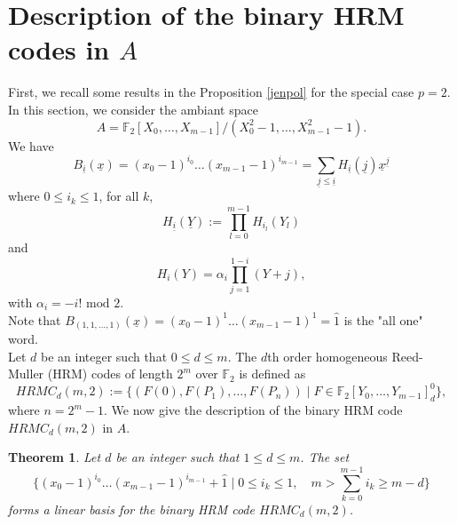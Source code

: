 \documentclass{article}
\theoremstyle{plain}
\newtheorem{thm}{Theorem}[section]
\theoremstyle{definition}
\begin{document}
\section{Description of the binary HRM codes in $A$}
First, we recall some results in the Proposition \ref{jenpol} for the special case $p=2$. In this section, we consider the ambiant space
\begin{equation*}
A=\mathbb{F}_{2}[X_{0},\ldots ,X_{m-1}]/(X_{0}^{2}-1,\ldots ,X_{m-1}^{2}-1).
\end{equation*}
We have
\begin{equation*}
B_{\underline{i}}(\underline{x})=(x_{0}-1)^{i_0}\ldots (x_{m-1}-1)^{i_{m-1}}=\sum_{\underline{j}\leq \underline{i}}H_{\underline{i}}(\underline{j})\underline{x}^{\underline{j}}
\end{equation*}
where $0\leq i_{k}\leq 1$, for all $k$,
\begin{equation*}
H_{\underline{i}}(\underline{Y}):=\prod_{l=0}^{m-1}H_{i_l}(Y_l)
\end{equation*}
and
\begin{equation*}
H_i(Y) = \alpha_i \prod_{j=1}^{1-i} (Y+j),
\end{equation*}
with $\alpha_i = - i! \mbox{ mod } 2$.\\
Note that $B_{(1,1,\ldots,1)}(\underline{x})=(x_{0}-1)^1\ldots (x_{m-1}-1)^1=\hat{1}$ is the "all one" word.\\
Let $d$ be an integer such that $0\leq d\leq m$. The $d$th order homogeneous Reed-Muller (HRM) codes of length $2^m$ over $\mathbb{F}_{2}$ is defined as
\begin{equation*}
HRMC_{d}(m,2):=\{(F(0),F(P_{1}),\ldots,F(P_{n}))\mid F\in \mathbb{F}_{2}[Y_{0},\ldots,Y_{m-1}]_{d}^{0}\},
\end{equation*}
where $n=2^m-1$.
We now give the description of the binary HRM code $HRMC_{d}(m,2)$ in $A$.
\begin{thm}
Let $d$ be an integer such that $1\leq d\leq m$. The set
\begin{equation*}
\{(x_{0}-1)^{i_0}\ldots (x_{m-1}-1)^{i_{m-1}}+\hat{1}\mid 0\leq i_{k}\leq 1,\quad m>\sum_{k=0}^{m-1}i_{k}\geq m-d\}
\end{equation*}
forms a linear basis for the binary HRM code $HRMC_{d}(m,2)$.
\end{thm}
\end{document}
